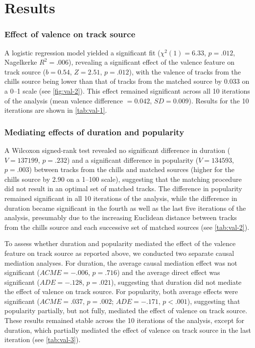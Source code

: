 \section{Results}
\label{se:val-results}

\subsubsection{Effect of valence on track source}

A logistic regression model yielded a significant fit ($\chi^2(1) = 6.33$, $p = .012$, Nagelkerke $R^2 = .006$), revealing a significant effect of the valence feature on track source ($b = 0.54$, $Z = 2.51$, $p = .012$), with the valence of tracks from the chills source being lower than that of tracks from the matched source by 0.033 on a 0--1 scale (see \autoref{fig:val-2}). This effect remained significant across all 10 iterations of the analysis (mean valence difference $= 0.042$, $SD = 0.009$). Results for the 10 iterations are shown in \autoref{tab:val-1}.



\subsubsection{Mediating effects of duration and popularity}
\label{se:val-results-2}

A Wilcoxon signed-rank test revealed no significant difference in duration ($V = 137199$, $p = .232$) and a significant difference in popularity ($V = 134593$, $p = .003$) between tracks from the chills and matched sources (higher for the chills source by 2.90 on a 1--100 scale), suggesting that the matching procedure did not result in an optimal set of matched tracks. The difference in popularity remained significant in all 10 iterations of the analysis, while the difference in duration became significant in the fourth as well as the last five iterations of the analysis, presumably due to the increasing Euclidean distance between tracks from the chills source and each successive set of matched sources (see \autoref{tab:val-2}).



To assess whether duration and popularity mediated the effect of the valence feature on track source as reported above, we conducted two separate causal mediation analyses. For duration, the average causal mediation effect was not significant ($ACME = -.006$, $p = .716$) and the average direct effect was significant ($ADE = -.128$, $p = .021$), suggesting that duration did not mediate the effect of valence on track source. For popularity, both average effects were significant ($ACME = .037$, $p = .002$; $ADE = -.171$, $p < .001$), suggesting that popularity partially, but not fully, mediated the effect of valence on track source. These results remained stable across the 10 iterations of the analysis, except for duration, which partially mediated the effect of valence on track source in the last iteration (see \autoref{tab:val-3}).

